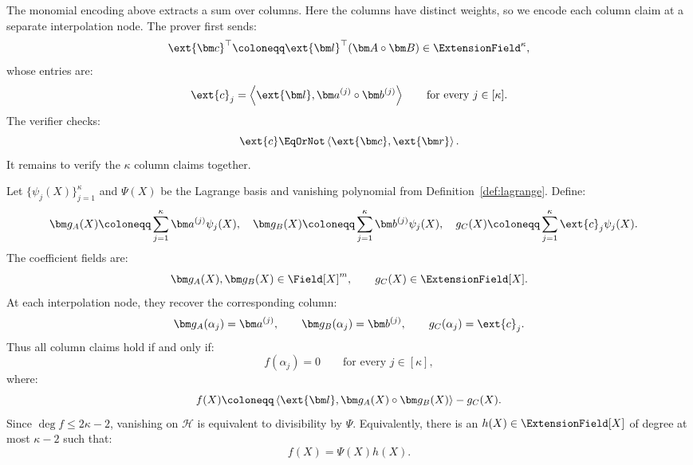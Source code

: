 The monomial encoding above extracts a sum over columns.
Here the columns have distinct weights, so we encode each column
claim at a separate interpolation node. The prover first sends:
\[
    \ext{\bm c}^{\top}
    \coloneqq
    \ext{\bm l}^{\top}
    (\bm A\circ\bm B)
    \in\ExtensionField^\kappa,
\]
whose entries are:
\[
    \ext{c}_j
    =
    \left\langle
        \ext{\bm l},
        \bm a^{(j)}\circ\bm b^{(j)}
    \right\rangle
    \qquad
    \text{for every }j\in[\kappa].
\]
The verifier checks:
\begin{equation*}
    \ext{c}
    \EqOrNot
    \left\langle
        \ext{\bm c},\ext{\bm r}
    \right\rangle.
\end{equation*}
It remains to verify the \(\kappa\) column claims together.

Let \(\{\psi_j(X)\}_{j=1}^{\kappa}\) and \(\Psi(X)\) be the
Lagrange basis and vanishing polynomial from
Definition~\ref{def:lagrange}. Define:
\[
\begin{aligned}
    \bm g_A(X)
    &\coloneqq
    \sum_{j=1}^{\kappa}
    \bm a^{(j)}\psi_j(X),
    \quad
    \bm g_B(X)
    \coloneqq
    \sum_{j=1}^{\kappa}
    \bm b^{(j)}\psi_j(X),
    \quad
    g_C(X)
    \coloneqq
    \sum_{j=1}^{\kappa}
    \ext{c}_j\psi_j(X).
\end{aligned}
\]
The coefficient fields are:
\[
    \bm g_A(X),\bm g_B(X)\in\Field[X]^m,
    \qquad
    g_C(X)\in\ExtensionField[X].
\]
At each interpolation node, they recover the corresponding column:
\[
    \bm g_A(\alpha_j)=\bm a^{(j)},
    \qquad
    \bm g_B(\alpha_j)=\bm b^{(j)},
    \qquad
    g_C(\alpha_j)=\ext{c}_j.
\]
Thus all column claims hold if and only if:
\[
    f(\alpha_j)=0
    \qquad
    \text{for every }j\in[\kappa],
\]
where:
\begin{equation*}
    f(X)
    \coloneqq
    \left\langle
        \ext{\bm l},
        \bm g_A(X)\circ\bm g_B(X)
    \right\rangle
    -
    g_C(X).
\end{equation*}
Since \(\deg f\leq2\kappa-2\), vanishing on \(\mathcal H\)
is equivalent to divisibility by \(\Psi\). Equivalently, there is
an \(h(X)\in\ExtensionField[X]\) of degree at most \(\kappa-2\)
such that:
\begin{equation}
    f(X)=\Psi(X)h(X).
\label{eq:hadamard-quotient}
\end{equation}

